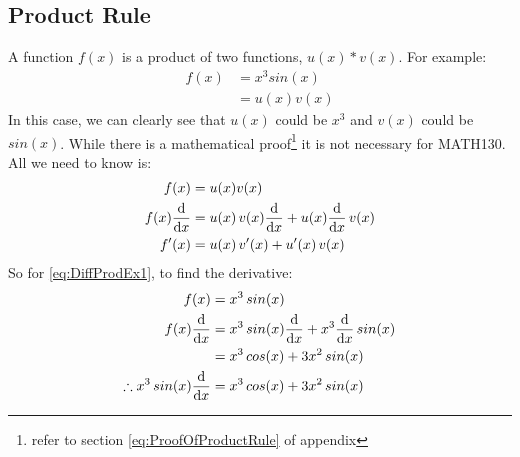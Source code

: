\subsection{Product Rule}
\label{sec:ProductRule}
A function $f(x)$ is a product of two functions, $u(x) * v(x)$. For example:
\begin{align}
  f(x) & = {x}^{3} sin(x) \label{eq:DiffProdEx1}\\
       & = u(x)v(x)
\end{align}
In this case, we can clearly see that $u(x)$ could be ${x}^{3}$ and $v(x)$
could be $sin(x)$. While there is a mathematical proof\footnote{refer to section
\ref{eq:ProofOfProductRule} of appendix} it is not necessary for MATH130.
All we need to know is:
\begin{align}
             f(x) & = u(x)v(x) \\
  f(x)\frac{\mathrm{d}}{\mathrm{d}x} & = u(x)\,v(x)\frac{\mathrm{d}}{\mathrm{d}x} + u(x)\frac{\mathrm{d}}{\mathrm{d}x}\,v(x) \\
            f'(x) & = u(x)\,v'(x) + u'(x)\,v(x)
\end{align}
So for \ref{eq:DiffProdEx1}, to find the derivative:
\begin{align}
            f(x)  & = {x}^{3}\,sin(x) \nonumber \\
  f(x)\frac{\mathrm{d}}{\mathrm{d}x} & = {x}^{3}\,sin(x)\frac{\mathrm{d}}{\mathrm{d}x} + {x}^{3}\frac{\mathrm{d}}{\mathrm{d}x}\,sin(x) \\
                  & = {x}^{3}\,cos(x) + 3{x}^{2}\,sin(x) \\
  \therefore {x}^{3}\,sin(x)\frac{\mathrm{d}}{\mathrm{d}x}  & = {x}^{3}\,cos(x) + 3{x}^{2}\,sin(x)
\end{align}
\newpage
